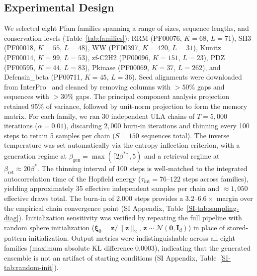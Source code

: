 \documentclass[11pt,onecolumn,twoside,lineno]{pnas-new}
\begin{document}
{\subsection*{Experimental Design}
We selected eight Pfam families spanning a range of sizes, sequence lengths, and conservation levels (Table~\ref{tab:families}): RRM (PF00076, $K{=}68$, $L{=}71$), SH3 (PF00018, $K{=}55$, $L{=}48$), WW (PF00397, $K{=}420$, $L{=}31$), Kunitz (PF00014, $K{=}99$, $L{=}53$), zf-C2H2 (PF00096, $K{=}151$, $L{=}23$), PDZ (PF00595, $K{=}44$, $L{=}83$), Pkinase (PF00069, $K{=}37$, $L{=}262$), and Defensin\_beta (PF00711, $K{=}45$, $L{=}36$). Seed alignments were downloaded from InterPro~\cite{mistryPfamProteinFamilies2021} and cleaned by removing columns with $>50\%$ gaps and sequences with $>30\%$ gaps. The principal component analysis projection retained 95\% of variance, followed by unit-norm projection to form the memory matrix. For each family, we ran 30 independent ULA chains of $T{=}5{,}000$ iterations ($\alpha{=}0.01$), discarding $2{,}000$ burn-in iterations and thinning every 100 steps to retain 5 samples per chain ($S{=}150$ sequences total). The inverse temperature was set automatically via the entropy inflection criterion, with a generation regime at $\beta_{\mathrm{gen}}=\max(\lceil 2\beta^*\rceil,5)$ and a retrieval regime at $\beta_{\mathrm{ret}} \approx 20\beta^*$. The thinning interval of 100 steps is well-matched to the integrated autocorrelation time of the Hopfield energy ($\tau_{\mathrm{int}} = 76$--$122$ steps across families), yielding approximately 35 effective independent samples per chain and ${\approx}1{,}050$ effective draws total. The burn-in of 2{,}000 steps provides a $3.2$--$6.6\times$ margin over the empirical chain convergence point (SI Appendix, Table~\ref{SI-tab:sampling-diag}). Initialization sensitivity was verified by repeating the full pipeline with random sphere initialization ($\boldsymbol{\xi}_0 = \mathbf{z}/\|\mathbf{z}\|_2$, $\mathbf{z} \sim \mathcal{N}(\mathbf{0}, \mathbf{I}_d)$) in place of stored-pattern initialization. Output metrics were indistinguishable across all eight families (maximum absolute KL difference $0.0003$), indicating that the generated ensemble is not an artifact of starting conditions (SI Appendix, Table~\ref{SI-tab:random-init}).

}
\end{document}
